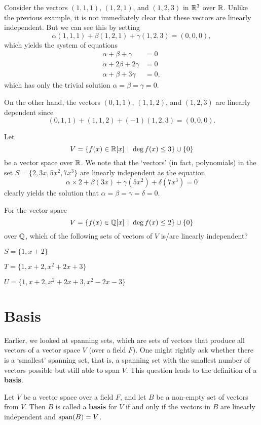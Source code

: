 \begin{example}
    Consider the vectors $(1, 1, 1)$, $(1, 2, 1)$, and $(1, 2, 3)$ in $\mathbb{R}^3$ over $\mathbb{R}$. Unlike the previous example, it is not immediately clear that these vectors are linearly independent. But we can see this by setting
    \[
        \alpha(1, 1, 1) + \beta(1, 2, 1) + \gamma(1, 2, 3) = (0, 0, 0),
    \]
    which yields the system of equations
    \begin{align*}
        \alpha + \beta + \gamma &= 0\\
        \alpha + 2\beta + 2\gamma &= 0\\
        \alpha + \beta + 3\gamma &= 0,
    \end{align*}
    which has only the trivial solution $\alpha = \beta = \gamma = 0$.

    On the other hand, the vectors $(0, 1, 1)$, $(1, 1, 2)$, and $(1, 2, 3)$ are linearly dependent since
    \[
        (0, 1, 1) + (1, 1, 2) + (-1)(1, 2, 3) = (0, 0, 0).
    \]
\end{example}

\begin{example}
    Let
    \[
        V = \{f(x) \in \R[x] \vert \deg f(x) \leq 3\} \cup \{0\}
    \]
    be a vector space over $\mathbb{R}$. We note that the `vectors' (in fact, polynomials) in the set $S = \{2, 3x, 5x^2, 7x^3\}$ are linearly independent as the equation
    \[
        \alpha\times2 + \beta(3x) + \gamma(5x^2) + \delta(7x^3) = 0
    \]
    clearly yields the solution that $\alpha = \beta = \gamma = \delta = 0$.
\end{example}

\begin{exercise}\label{exercise-polynomial-of-degree-at-most-2-vector-space}
    For the vector space
    \[
        V = \{f(x) \in \Q[x] \vert \deg f(x) \leq 2\} \cup \{0\}
    \]
    over $\mathbb{Q}$, which of the following sets of vectors of $V$ is/are linearly independent?
    \begin{partquestions}{\alph*}
        \item $S = \{1, x + 2\}$
        \item $T = \{1, x + 2, x^2 + 2x + 3\}$
        \item $U = \{1, x + 2, x^2 + 2x + 3, x^2 - 2x - 3\}$
    \end{partquestions}
\end{exercise}

\section{Basis}
Earlier, we looked at spanning sets, which are sets of vectors that produce all vectors of a vector space $V$ (over a field $F$). One might rightly ask whether there is a `smallest' spanning set, that is, a spanning set with the smallest number of vectors possible but still able to span $V$. This question leads to the definition of a \textbf{basis}.
\begin{definition}
    Let $V$ be a vector space over a field $F$, and let $B$ be a non-empty set of vectors from $V$. Then $B$ is called a \textbf{basis} for $V$ if and only if the vectors in $B$ are linearly independent and $\mathrm{span}(B) = V$.
\end{definition}

